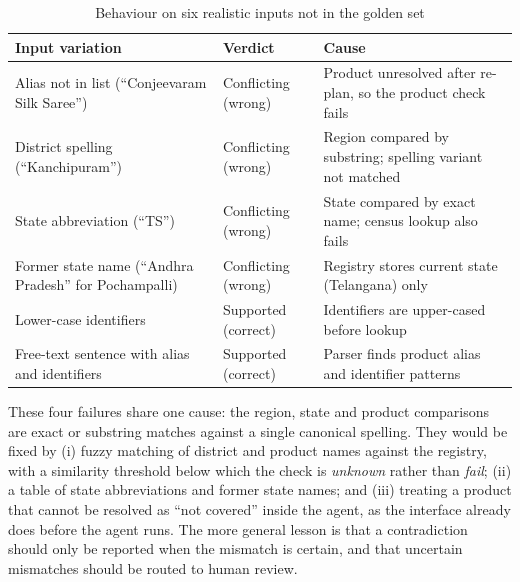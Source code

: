 \begin{table}[H]
\centering
\caption{Behaviour on six realistic inputs not in the golden set}
\label{tab:probes}
\small
\begin{tabularx}{\linewidth}{@{}>{\raggedright\arraybackslash}p{4.4cm} >{\raggedright\arraybackslash}p{2.3cm} >{\raggedright\arraybackslash}X@{}}
\toprule
\textbf{Input variation} & \textbf{Verdict} & \textbf{Cause} \\ \midrule
Alias not in list (``Conjeevaram Silk Saree'') & Conflicting (wrong) & Product unresolved after re-plan, so the product check fails \\
District spelling (``Kanchipuram'') & Conflicting (wrong) & Region compared by substring; spelling variant not matched \\
State abbreviation (``TS'') & Conflicting (wrong) & State compared by exact name; census lookup also fails \\
Former state name (``Andhra Pradesh'' for Pochampalli) & Conflicting (wrong) & Registry stores current state (Telangana) only \\
Lower-case identifiers & Supported (correct) & Identifiers are upper-cased before lookup \\
Free-text sentence with alias and identifiers & Supported (correct) & Parser finds product alias and identifier patterns \\
\bottomrule
\end{tabularx}
\end{table}

These four failures share one cause: the region, state and product comparisons are exact or substring
matches against a single canonical spelling. They would be fixed by (i) fuzzy matching of district and
product names against the registry, with a similarity threshold below which the check is
\emph{unknown} rather than \emph{fail}; (ii) a table of state abbreviations and former state names; and
(iii) treating a product that cannot be resolved as ``not covered'' inside the agent, as the interface
already does before the agent runs. The more general lesson is that a contradiction should only be
reported when the mismatch is certain, and that uncertain mismatches should be routed to human review.
